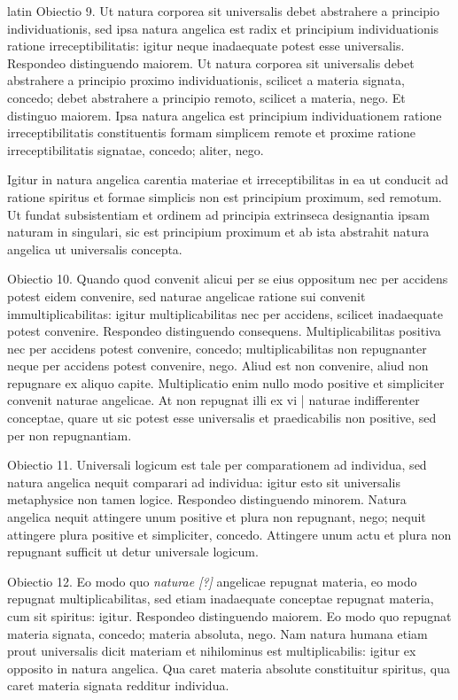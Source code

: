 \begin{otherlanguage*}{latin}
\pstart
Obiectio 9. Ut natura corporea sit universalis debet abstrahere a principio individuationis, sed ipsa natura angelica est radix et principium individuationis ratione irreceptibilitatis:
igitur neque inadaequate potest esse universalis. Respondeo distinguendo maiorem. Ut natura corporea sit universalis debet abstrahere a principio proximo individuationis, scilicet a materia signata, concedo; debet abstrahere a principio remoto, scilicet a materia, nego. Et distinguo maiorem. Ipsa natura angelica est principium individuationem ratione irreceptibilitatis constituentis formam simplicem remote et proxime ratione irreceptibilitatis signatae, concedo; aliter, nego. 
\pend

\pstart
Igitur in natura angelica carentia materiae et irreceptibilitas in ea ut conducit ad ratione spiritus et formae simplicis non est principium proximum, sed remotum. Ut fundat subsistentiam et ordinem ad principia extrinseca designantia ipsam naturam in singulari, sic est principium proximum et ab ista abstrahit natura angelica ut universalis concepta. 
\pend

\pstart
Obiectio 10. Quando quod convenit alicui per se eius oppositum nec per accidens potest eidem convenire, sed naturae angelicae ratione sui convenit immultiplicabilitas:
igitur multiplicabilitas nec per accidens, scilicet inadaequate potest convenire. Respondeo distinguendo consequens. Multiplicabilitas positiva nec per accidens potest convenire, concedo; multiplicabilitas non repugnanter neque per accidens potest convenire, nego. Aliud est non convenire, aliud non repugnare ex aliquo capite. Multiplicatio enim nullo modo positive et simpliciter convenit naturae angelicae. At non repugnat illi ex vi \textnormal{|} naturae indifferenter conceptae, quare ut sic potest esse universalis et praedicabilis non positive, sed per non repugnantiam. 
\pend

\pstart
Obiectio 11. Universali logicum est tale per comparationem ad individua, sed natura angelica nequit comparari ad individua:
igitur esto sit universalis metaphysice non tamen logice. Respondeo distinguendo minorem. Natura angelica nequit attingere unum positive et plura non repugnant, nego; nequit attingere plura positive et simpliciter, concedo. Attingere unum actu et plura non repugnant sufficit ut detur universale logicum. 
\pend

\pstart
Obiectio 12. Eo modo quo \emph{naturae [?]} angelicae repugnat materia, eo modo repugnat multiplicabilitas, sed etiam inadaequate conceptae repugnat materia, cum sit spiritus:
igitur. Respondeo distinguendo maiorem. Eo modo quo repugnat materia signata, concedo; materia absoluta, nego. Nam natura humana etiam prout universalis dicit materiam et nihilominus est multiplicabilis:
igitur ex opposito in natura angelica. Qua caret materia absolute constituitur spiritus, qua caret materia signata redditur individua. 
\pend


\end{otherlanguage*}
